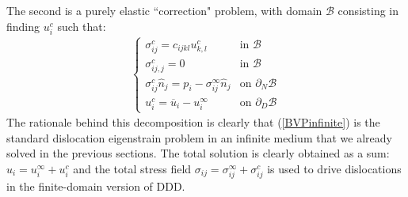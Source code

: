 The second is a purely elastic ``correction" problem, with domain $\mathcal{B}$ consisting in finding $u_i^c$ such that:
\begin{align}
\begin{cases}
\sigma^c_{ij}=c_{ijkl}u^c_{k,l}& \mbox{in }\mathcal{B}\\
\sigma^c_{ij,j}=0 & \mbox{in }\mathcal{B}\\
\sigma^c_{ij}\hat{n}_j=p_i- \sigma^\infty_{ij}\hat{n}_j& \mbox{on } \partial_N\mathcal{B}\\
u_i^c=\overline{u}_i-u^\infty_i & \mbox{on } \partial_D\mathcal{B}
\end{cases}
\label{BVPcorrection}
\end{align}
The rationale behind this decomposition is clearly that (\ref{BVPinfinite}) is the standard dislocation eigenstrain problem in an infinite medium that we already solved in the previous sections. The total solution is clearly obtained as a sum: $u_i=u_i^\infty+u_i^c$ and the total stress field $\sigma_{ij}=\sigma_{ij}^\infty+\sigma_{ij}^c$ is used to drive dislocations in the finite-domain version of DDD.


  
